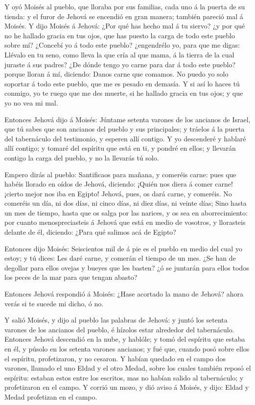  Y oyó Moisés al pueblo, que lloraba por sus familias, cada
uno á la puerta de su tienda: y el furor de Jehová se encendió en gran
manera; también pareció mal á Moisés.  Y dijo Moisés á
Jehová: ¿Por qué has hecho mal á tu siervo? ¿y por qué no he hallado
gracia en tus ojos, que has puesto la carga de todo este pueblo sobre
mí?  ¿Concebí yo á todo este pueblo? ¿engendrélo yo, para
que me digas: Llévalo en tu seno, como lleva la que cría al que mama, á
la tierra de la cual juraste á sus padres?  ¿De dónde tengo
yo carne para dar á todo este pueblo? porque lloran á mí, diciendo:
Danos carne que comamos.  No puedo yo solo soportar á todo
este pueblo, que me es pesado en demasía.  Y si así lo
haces tú conmigo, yo te ruego que me des muerte, si he hallado gracia en
tus ojos; y que yo no vea mi mal.

 Entonces Jehová dijo á Moisés: Júntame setenta varones de
los ancianos de Israel, que tú sabes que son ancianos del pueblo y sus
principales; y tráelos á la puerta del tabernáculo del testimonio, y
esperen allí contigo.  Y yo descenderé y hablaré allí
contigo; y tomaré del espíritu que está en ti, y pondré en ellos; y
llevarán contigo la carga del pueblo, y no la llevarás tú solo.

 Empero dirás al pueblo: Santificaos para mañana, y
comeréis carne: pues que habéis llorado en oídos de Jehová, diciendo:
¡Quién nos diera á comer carne! ¡cierto mejor nos iba en Egipto! Jehová,
pues, os dará carne, y comeréis.  No comeréis un día, ni
dos días, ni cinco días, ni diez días, ni veinte días; 
Sino hasta un mes de tiempo, hasta que os salga por las narices, y os
sea en aborrecimiento: por cuanto menospreciasteis á Jehová que está en
medio de vosotros, y llorasteis delante de él, diciendo: ¿Para qué
salimos acá de Egipto?

 Entonces dijo Moisés: Seiscientos mil de á pie es el
pueblo en medio del cual yo estoy; y tú dices: Les daré carne, y comerán
el tiempo de un mes.  ¿Se han de degollar para ellos ovejas
y bueyes que les basten? ¿ó se juntarán para ellos todos los peces de la
mar para que tengan abasto?

 Entonces Jehová respondió á Moisés: ¿Hase acortado la mano
de Jehová? ahora verás si te sucede mi dicho, ó no.

 Y salió Moisés, y dijo al pueblo las palabras de Jehová: y
juntó los setenta varones de los ancianos del pueblo, é hízolos estar
alrededor del tabernáculo.  Entonces Jehová descendió en la
nube, y hablóle; y tomó del espíritu que estaba en él, y púsolo en los
setenta varones ancianos; y fué que, cuando posó sobre ellos el
espíritu, profetizaron, y no cesaron.  Y habían quedado en
el campo dos varones, llamado el uno Eldad y el otro Medad, sobre los
cuales también reposó el espíritu: estaban estos entre los escritos, mas
no habían salido al tabernáculo; y profetizaron en el campo.
 Y corrió un mozo, y dió aviso á Moisés, y dijo: Eldad y
Medad profetizan en el campo.

